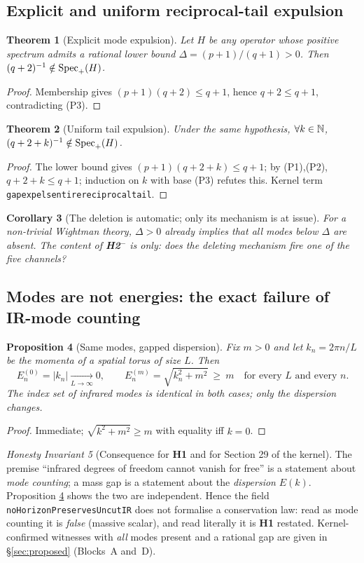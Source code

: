 \documentclass[11pt,a4paper]{article}
\theoremstyle{plain}
\newtheorem{theorem}{Theorem}[section]
\newtheorem{proposition}[theorem]{Proposition}
\newtheorem{corollary}[theorem]{Corollary}
\theoremstyle{definition}
\theoremstyle{remark}
\newtheorem{invariant}[theorem]{Honesty Invariant}
\renewcommand{\_}{\oldunderscore\allowbreak}
\newcommand{\Lean}[1]{\texttt{\small #1}}
\begin{document}
\subsection{Explicit and uniform reciprocal-tail expulsion}
\begin{theorem}[Explicit mode expulsion]\label{thm:expulsion}
Let $H$ be \emph{any} operator whose positive spectrum admits a rational lower bound
$\Delta=(p+1)/(q+1)>0$. Then $(q+2)^{-1}\notin\operatorname{Spec}_+(H)$.
\end{theorem}
\begin{proof}
Membership gives $(p+1)(q+2)\le q+1$, hence $q+2\le q+1$, contradicting (P3).
\end{proof}
\begin{theorem}[Uniform tail expulsion]\label{thm:tail}
Under the same hypothesis, $\forall k\in\mathbb{N}$, $(q+2+k)^{-1}\notin\operatorname{Spec}_+(H)$.
\end{theorem}
\begin{proof}
The lower bound gives $(p+1)(q+2+k)\le q+1$; by (P1),(P2), $q+2+k\le q+1$; induction on $k$
with base (P3) refutes this. Kernel term \Lean{gap\_expels\_entire\_reciprocal\_tail}.
\end{proof}
\begin{corollary}[The deletion is automatic; only its mechanism is at issue]\label{cor:deletion}
For a non-trivial Wightman theory, $\Delta>0$ already implies that all modes below $\Delta$ are
absent. The content of \textbf{H2$^-$} is only: \emph{does the deleting mechanism fire one of the
five channels?}
\end{corollary}
\subsection{Modes are not energies: the exact failure of IR-mode counting}\label{sub:modes}
\begin{proposition}[Same modes, gapped dispersion]\label{prop:modes}
Fix $m>0$ and let $k_n=2\pi n/L$ be the momenta of a spatial torus of size $L$. Then
\[
E_n^{(0)}=|k_n|\xrightarrow[L\to\infty]{}0,
\qquad
E_n^{(m)}=\sqrt{k_n^2+m^2}\ \ge\ m\quad\text{for every }L\text{ and every }n .
\]
The index set of infrared modes is \emph{identical} in both cases; only the dispersion changes.
\end{proposition}
\begin{proof}
Immediate; $\sqrt{k^2+m^2}\ge m$ with equality iff $k=0$.
\end{proof}
\begin{invariant}[Consequence for \textbf{H1} and for Section 29 of the kernel]\label{inv:modes}
The premise ``infrared degrees of freedom cannot vanish for free'' is a statement about
\emph{mode counting}; a mass gap is a statement about the \emph{dispersion} $E(k)$. Proposition
\ref{prop:modes} shows the two are independent. Hence the field
\Lean{noHorizonPreservesUncutIR} does not formalise a conservation law: read as mode counting it
is \emph{false} (massive scalar), and read literally it is \textbf{H1} restated. Kernel-confirmed
witnesses with \emph{all} modes present and a rational gap are given in \S\ref{sec:proposed} (Blocks~A and~D).
\end{invariant}
\end{document}
